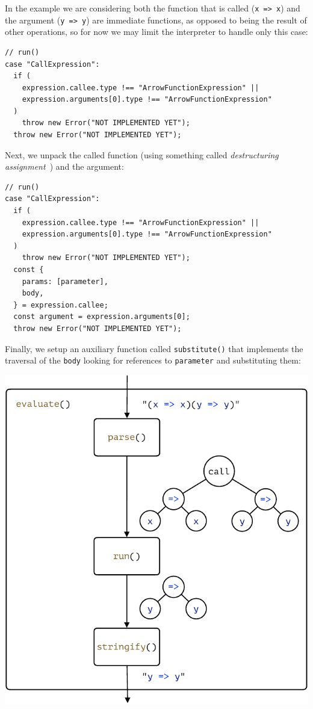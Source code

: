 \documentclass[12pt, oneside]{book}
\begin{document}
In the example we are considering both the function that is called (\texttt{x => x}) and the argument (\texttt{y => y}) are immediate functions, as opposed to being the result of other operations, so for now we may limit the interpreter to handle only this case:

\begin{verbatim}
// run()
case "CallExpression":
  if (
    expression.callee.type !== "ArrowFunctionExpression" ||
    expression.arguments[0].type !== "ArrowFunctionExpression"
  )
    throw new Error("NOT IMPLEMENTED YET");
  throw new Error("NOT IMPLEMENTED YET");
\end{verbatim}

Next, we unpack the called function (using something called \emph{destructuring assignment}~\cite{javascript-destructuring-assignment}) and the argument:

\begin{verbatim}
// run()
case "CallExpression":
  if (
    expression.callee.type !== "ArrowFunctionExpression" ||
    expression.arguments[0].type !== "ArrowFunctionExpression"
  )
    throw new Error("NOT IMPLEMENTED YET");
  const {
    params: [parameter],
    body,
  } = expression.callee;
  const argument = expression.arguments[0];
  throw new Error("NOT IMPLEMENTED YET");
\end{verbatim}

Finally, we setup an auxiliary function called \texttt{substitute()} that implements the traversal of the \texttt{body} looking for references to \texttt{parameter} and substituting them:

\begin{center}
\includegraphics[page = 4]{images.pdf}
\end{center}
\end{document}

